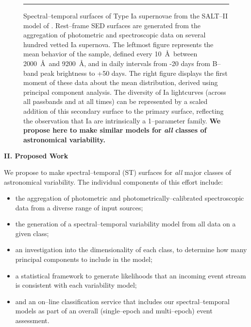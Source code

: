 \begin{figure}[t]
\centerline{ \hfil
{}} \smallskip
\caption[]{\footnotesize Spectral--temporal surfaces of Type Ia supernovae from
the SALT--II model of \cite{2007A&A...466...11G}.  Rest--frame SED surfaces are
generated from the aggregation of photometric and spectroscopic data on several
hundred vetted Ia supernova.  The leftmost figure represents the mean behavior
of the sample, defined every 10~\AA~between 2000~\AA~and 9200~\AA, and in daily
intervals from -20 days from B--band peak brightness to +50 days.  The right
figure displays the first moment of these data about the mean distribution,
derived using principal component analysis.  The diversity of Ia lightcurves
(across all passbands and at all times) can be represented by a scaled addition
of this secondary surface to the primary surface, reflecting the observation
that Ia are intrinsically a 1--parameter family.  {\bf We propose here to make
similar models for {\it all} classes of astronomical variability.}} \medskip
\hrule \label{fig:salt2} \end{figure}

\bigskip \centerline{\bf II. Proposed Work} \smallskip

We propose to make spectral--temporal (ST) surfaces for {\it all} major classes
of astronomical variability.  The individual components of this effort include:

\begin{itemize}

\item the aggregation of photometric and photometrically--calibrated
spectroscopic data from a diverse range of input sources;

\item the generation of a spectral--temporal variability model from all data on
a given class;

\item an investigation into the dimensionality of each class, to determine how
many principal components to include in the model;

\item a statistical framework to generate likelihoods that an incoming event
stream is consistent with each variability model;

\item and an on--line classification service that includes our
spectral--temporal models as part of an overall (single--epoch and multi--epoch)
event assessment.

\end{itemize}

